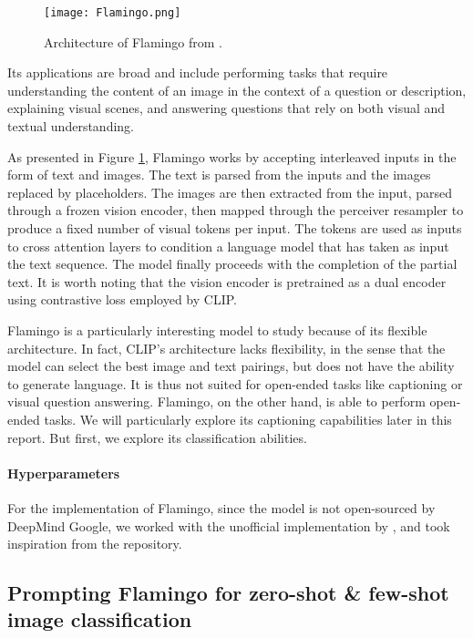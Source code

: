\begin{figure}[ht]
  \centering
  \texttt{[image: Flamingo.png]}
  \caption{Architecture of Flamingo from \cite{alayrac2022flamingo}.}
  \label{fig:flamingo}
\end{figure}
 
Its applications are broad and include performing tasks that require understanding the content of an image in the context of a question or description, explaining visual scenes, and answering questions that rely on both visual and textual understanding.


As presented in Figure \ref{fig:flamingo}, Flamingo works by accepting interleaved inputs in the form of text and images. The text is parsed from the inputs and the images replaced by placeholders. The images are then extracted from the input, parsed through a frozen vision encoder, then mapped through the perceiver resampler to produce a fixed number of visual tokens per input. The tokens are used as inputs to cross attention layers to condition a language model that has taken as input the text sequence. The model finally proceeds with the completion of the partial text. It is worth noting that the vision encoder is pretrained as a dual encoder using contrastive loss employed by CLIP.

Flamingo is a particularly interesting model to study because of its flexible architecture. In fact, CLIP's architecture lacks flexibility, in the sense that the model can select the best image and text pairings, but does not have the ability to generate language. It is thus not suited for open-ended tasks like captioning or visual question answering. Flamingo, on the other hand, is able to perform open-ended tasks. We will particularly explore its captioning capabilities later in this report. But first, we explore its classification abilities.

\paragraph{Hyperparameters} For the implementation of Flamingo, since the model is not open-sourced by DeepMind Google, we worked with the unofficial implementation by \cite{mlfoundations2022openflamingo}, \parencite{openai2022clip-repo} and took inspiration from the \parencite{lucidrains2022flampytorch} repository.


\subsection{Prompting Flamingo for zero-shot \& few-shot image classification}

